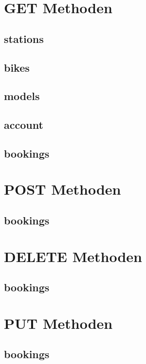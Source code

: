 \section{GET Methoden}
\subsection{stations}

\subsection{bikes}

\subsection{models}

\subsection{account}

\subsection{bookings}

\section{POST Methoden}
\subsection{bookings}

\section{DELETE Methoden}
\subsection{bookings}

\section{PUT Methoden}
\subsection{bookings}


